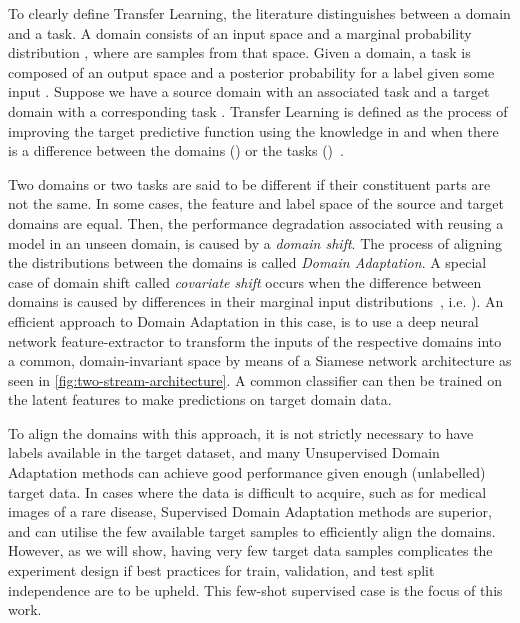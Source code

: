\documentclass[journal]{IEEEtran}
\begin{document}
To clearly define Transfer Learning, the literature distinguishes between a domain and a task. A domain  consists of an input space  and a marginal probability distribution , where  are  samples from that space. Given a domain, a task  is composed of an output space  and a posterior probability  for a label  given some input . 
Suppose we have a source domain  with an associated task  and a target domain  with a corresponding task . Transfer Learning is defined as the  process of improving the target predictive function  using the knowledge in   and  when there is a difference between the domains () or the tasks ()~\cite{pan2010survey}. 

Two domains or two tasks are said to be different if their constituent parts are not the same. 
In some cases, the feature and label space of the source and target domains are equal. Then, the performance degradation associated with reusing a model in an unseen domain, is caused by a \textit{domain shift}. The process of aligning the distributions between the domains is called \textit{Domain Adaptation}. A special case of domain shift called \textit{covariate shift} occurs when the difference between domains is caused by differences in their marginal input distributions~\cite{kouw2018introduction}, i.e. ).
An efficient approach to Domain Adaptation in this case, is to use a deep neural network feature-extractor  to transform the inputs of the respective domains into a common, domain-invariant space by means of a Siamese network architecture as seen in \cref{fig:two-stream-architecture}. A common classifier  can then be trained on the latent features to make predictions on target domain data.

To align the domains with this approach, it is not strictly necessary to have labels available in the target dataset, and many Unsupervised Domain Adaptation methods can achieve good performance given enough (unlabelled) target data. In cases where the data is difficult to acquire, such as for medical images of a rare disease, Supervised Domain Adaptation methods are superior, and can utilise the few available target samples to efficiently align the domains. 
However, as we will show, having very few target data samples complicates the experiment design if best practices for train, validation, and test split independence are to be upheld.
This few-shot supervised case is the focus of this work.
\end{document}
